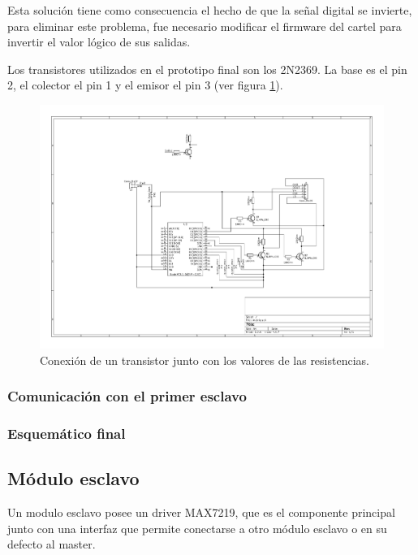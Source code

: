 Esta solución tiene como consecuencia el hecho de que la señal digital se invierte, para eliminar este problema, fue necesario modificar el firmware del cartel para invertir el valor lógico de sus salidas.

Los transistores utilizados en el prototipo final son los 2N2369. %
La base es el pin 2, el colector el pin 1 y el emisor el pin 3 (ver figura \ref{fig:transistors}).

\begin{figure}[ht!]
	\centering
	\begin{center}
		\includegraphics[scale=2]{imagenes/hw/transistor.pdf}
		\caption{Conexión de un transistor junto con los valores de las resistencias.}
		\label{fig:transistors}
	\end{center}
\end{figure}

\subsubsection{Comunicación con el primer esclavo}

\subsubsection{Esquemático final}



\subsection{Módulo esclavo}
Un modulo esclavo posee un driver MAX7219, que es el componente principal junto con una interfaz que permite conectarse a otro módulo esclavo o en su defecto al master.

